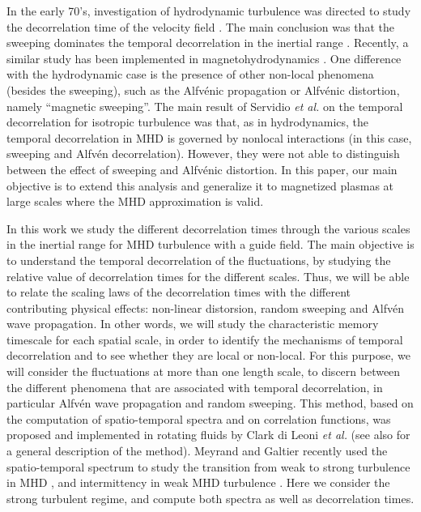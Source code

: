 \documentclass[aip,pop,reprint,amsmath,amssymb,floatfix]{revtex4-1}
\begin{document}
In the early 70's, investigation of hydrodynamic turbulence was
directed to study the decorrelation time of the velocity field
\cite{orszag_numerical_1972, orszag_analytical_1970,
  tennekes_eulerian_1975, heisenberg_zur_1948,
  comte-bellot_simple_1971}.  The main conclusion was that the
sweeping dominates the temporal decorrelation in the inertial range
\cite{zhou_non-gaussian_1993, sanada_random_1992}. Recently, a similar
study has been implemented in magnetohydrodynamics
\cite{servidio_time_2011, matthaeus_eulerian_2010,
  carbone_anisotropy_2011}. One difference with the hydrodynamic case
is the presence of other non-local phenomena (besides the sweeping),
such as the Alfv\'enic propagation or Alfv\'enic distortion, namely
``magnetic sweeping''. The main result of Servidio {\it et al.}
\cite{servidio_time_2011} on the temporal decorrelation for isotropic
turbulence was that, as in hydrodynamics, the temporal decorrelation
in MHD is governed by nonlocal interactions (in this case, sweeping
and Alfv\'en decorrelation). However, they were not able to
distinguish between the effect of sweeping and Alfv\'enic distortion.
In this paper, our main objective is to extend this analysis and
generalize it to magnetized plasmas at large scales where the MHD
approximation is valid.

In this work we study the different decorrelation times through the
various scales in the inertial range for MHD turbulence with a guide
field. The main objective is to understand the temporal decorrelation
of the fluctuations, by studying the relative value of decorrelation
times for the different scales. Thus, we will be able to relate the
scaling laws of the decorrelation times with the different
contributing physical effects: non-linear distorsion, random sweeping
and Alfv\'en wave propagation. In other words, we will study the
characteristic memory timescale for each spatial scale, in order to
identify the mechanisms of temporal decorrelation and to see whether
they are local or non-local. For this purpose, we will consider the
fluctuations at more than one length scale, to discern between the
different phenomena that are associated with temporal decorrelation,
in particular Alfv\'en wave propagation and random sweeping. This
method, based on the computation of spatio-temporal spectra and on
correlation functions, was proposed and implemented in rotating fluids
by Clark di Leoni {\it et al.}
\cite{clark_di_leoni_quantification_2014} (see also
\cite{clark_di_leoni_spatio-temporal_2015} for a general description
of the method). Meyrand and Galtier recently used the spatio-temporal
spectrum to study the transition from weak to strong turbulence in MHD
\cite{meyrand_direct_2016}, and intermittency in weak MHD turbulence
\cite{meyrand_weak_2015}. Here we consider the strong turbulent
regime, and compute both spectra as well as decorrelation times.
\end{document}
